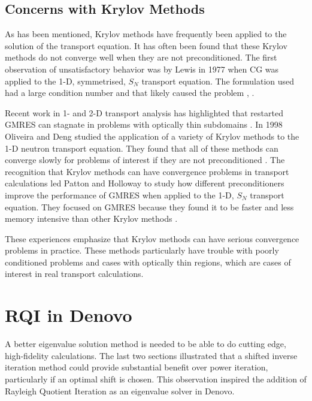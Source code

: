 \subsection{Concerns with Krylov Methods}
As has been mentioned, Krylov methods have frequently been applied to the solution of the transport equation. It has often been found that these Krylov methods do not converge well when they are not preconditioned. The first observation of unsatisfactory behavior was by Lewis in 1977 when CG was applied to the 1-D, symmetrised, $S_{N}$ transport equation. The formulation used had a large condition number and that likely caused the problem \cite{Lewis1977}, \cite{Gupta2004}. 

Recent work in 1- and 2-D transport analysis has highlighted that restarted GMRES can stagnate in problems with optically thin subdomains \cite{Rosa2010}. In 1998 Oliveira and Deng studied the application of a variety of Krylov methods to the 1-D neutron transport equation. They found that all of these methods can converge slowly for problems of interest if they are not preconditioned \cite{Oliveira1998}. The recognition that Krylov methods can have convergence problems in transport calculations led Patton and Holloway to study how different preconditioners improve the performance of GMRES when applied to the 1-D, $S_{N}$ transport equation. They focused on GMRES because they found it to be faster and less memory intensive than other Krylov methods \cite{Patton2002}. 

These experiences emphasize that Krylov methods can have serious convergence problems in practice. These methods particularly have trouble with poorly conditioned problems and cases with optically thin regions, which are cases of interest in real transport calculations.  

\section{RQI in Denovo}
A better eigenvalue solution method is needed to be able to do cutting edge, high-fidelity calculations. The last two sections illustrated that a shifted inverse iteration method could provide substantial benefit over power iteration, particularly if an optimal shift is chosen. This observation inspired the addition of Rayleigh Quotient Iteration as an eigenvalue solver in Denovo. 

